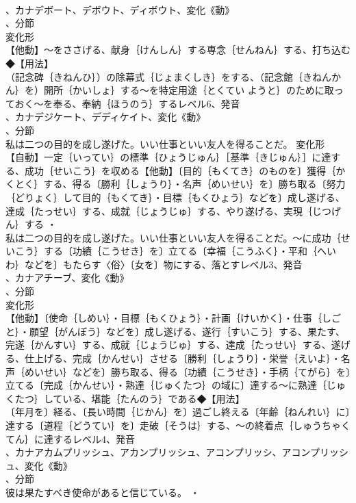 \documentclass[8pt]{extreport}
\begin{document}
\begin{CJK}{UTF8}{min}
\\	、カナデボート、デボウト、ディボウト、変化《動》
\\	、分節
\\	変化形 
\\	【他動】～をささげる、献身｛けんしん｝する専念｛せんねん｝する、打ち込む◆【用法】
\\	（記念碑｛きねんひ｝）の除幕式｛じょまくしき｝をする、（記念館｛きねんかん｝を）開所｛かいしょ｝する～を特定用途｛とくてい ようと｝のために取っておく～を奉る、奉納｛ほうのう｝するレベル6、発音
\\	、カナデジケート、デディケイト、変化《動》
\\	、分節
\\	私は二つの目的を成し遂げた。いい仕事といい友人を得ることだ。	変化形 
\\	【自動】一定｛いってい｝の標準｛ひょうじゅん｝［基準｛きじゅん｝］に達する、成功｛せいこう｝を収める【他動】〔目的｛もくてき｝のものを〕獲得｛かくとく｝する、得る〔勝利｛しょうり｝・名声｛めいせい｝を〕勝ち取る〔努力｛どりょく｝して目的｛もくてき｝・目標｛もくひょう｝などを〕成し遂げる、達成｛たっせい｝する、成就｛じょうじゅ｝する、やり遂げる、実現｛じつげん｝する ・
\\	私は二つの目的を成し遂げた。いい仕事といい友人を得ることだ。～に成功｛せいこう｝する〔功績｛こうせき｝を〕立てる〔幸福｛こうふく｝・平和｛へいわ｝などを〕もたらす〈俗〉〔女を〕物にする、落とすレベル3、発音
\\	、カナアチーブ、変化《動》
\\	、分節
\\	変化形 
\\	【他動】〔使命｛しめい｝・目標｛もくひょう｝・計画｛けいかく｝・仕事｛しごと｝・願望｛がんぼう｝などを〕成し遂げる、遂行｛すいこう｝する、果たす、完遂｛かんすい｝する、成就｛じょうじゅ｝する、達成｛たっせい｝する、遂げる、仕上げる、完成｛かんせい｝させる〔勝利｛しょうり｝・栄誉｛えいよ｝・名声｛めいせい｝などを〕勝ち取る、得る〔功績｛こうせき｝・手柄｛てがら｝を〕立てる〔完成｛かんせい｝・熟達｛じゅくたつ｝の域に〕達する～に熟達｛じゅくたつ｝している、堪能｛たんのう｝である◆【用法】
\\	〔年月を〕経る、〔長い時間｛じかん｝を〕過ごし終える〔年齢｛ねんれい｝に〕達する〔道程｛どうてい｝を〕走破｛そうは｝する、～の終着点｛しゅうちゃく てん｝に達するレベル4、発音
\\	、カナアカムプリッシュ、アカンプリッシュ、アコンプリッシ、アコンプリッシュ、変化《動》
\\	、分節
\\	彼は果たすべき使命があると信じている。 ・

\end{CJK}
\end{document}
